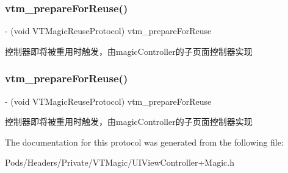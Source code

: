 \subsubsection{\texorpdfstring{vtm\+\_\+prepare\+For\+Reuse()}{vtm\_prepareForReuse()}\hspace{0.1cm}{\footnotesize\ttfamily [2/3]}}
{\footnotesize\ttfamily -\/ (void V\+T\+Magic\+Reuse\+Protocol) vtm\+\_\+prepare\+For\+Reuse \begin{DoxyParamCaption}{ }\end{DoxyParamCaption}\hspace{0.3cm}{\ttfamily [optional]}}

控制器即将被重用时触发，由magic\+Controller的子页面控制器实现 \mbox{\label{protocol_v_t_magic_reuse_protocol_01-p_a79dc4f79dcf1539853578c59391de0df}} 
\subsubsection{\texorpdfstring{vtm\+\_\+prepare\+For\+Reuse()}{vtm\_prepareForReuse()}\hspace{0.1cm}{\footnotesize\ttfamily [3/3]}}
{\footnotesize\ttfamily -\/ (void V\+T\+Magic\+Reuse\+Protocol) vtm\+\_\+prepare\+For\+Reuse \begin{DoxyParamCaption}{ }\end{DoxyParamCaption}\hspace{0.3cm}{\ttfamily [optional]}}

控制器即将被重用时触发，由magic\+Controller的子页面控制器实现 

The documentation for this protocol was generated from the following file\+:\begin{DoxyCompactItemize}
\item 
Pods/\+Headers/\+Private/\+V\+T\+Magic/U\+I\+View\+Controller+\+Magic.\+h\end{DoxyCompactItemize}
